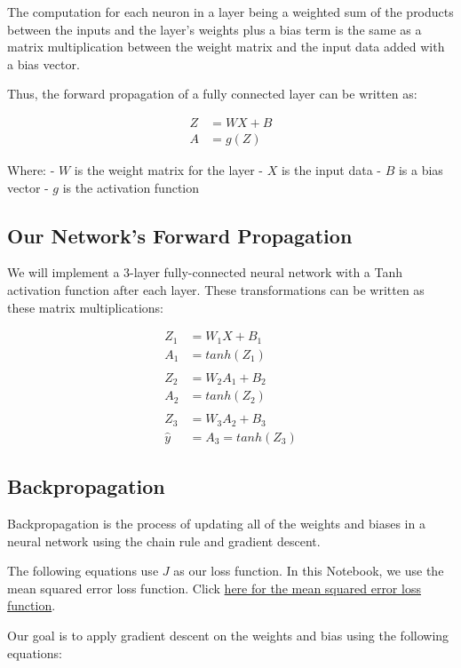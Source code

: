 \documentclass[openany]{book}
\begin{document}
The computation for each neuron in a layer being a weighted sum of the
products between the inputs and the layer's weights plus a bias term is
the same as a matrix multiplication between the weight matrix and the
input data added with a bias vector.

Thus, the forward propagation of a fully connected layer can be written
as:

\begin{align*}
Z &= W X + B \\
A &= g(Z)
\end{align*}

Where: - \(W\) is the weight matrix for the layer - \(X\) is the input
data - \(B\) is a bias vector - \(g\) is the activation function

    \subsection{Our Network's Forward
Propagation}\label{our-networks-forward-propagation}

    We will implement a 3-layer fully-connected neural network with a Tanh
activation function after each layer. These transformations can be
written as these matrix multiplications:

\begin{align*}
Z_1 &= W_1 X + B_1 \\
A_1 &= tanh(Z_1) \\
\\
Z_2 &= W_2 A_1 + B_2 \\
A_2 &= tanh(Z_2) \\
\\
Z_3 &= W_3 A_2 + B_3 \\
\hat{y} &= A_3 = tanh(Z_3)
\end{align*}

    \subsection{Backpropagation}\label{backpropagation}

Backpropagation is the process of updating all of the weights and biases
in a neural network using the chain rule and gradient descent.

The following equations use \(J\) as our loss function. In this
Notebook, we use the mean squared error loss function. Click
\hyperref[mean-squared-error]{here for the mean squared error loss function}.

Our goal is to apply gradient descent on the weights and bias using the
following equations:
\end{document}
